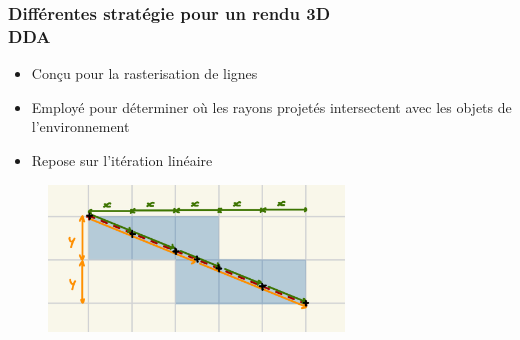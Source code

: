 \documentclass{beamer}
\begin{document}
\begin{frame}
    \frametitle{Différentes stratégie pour un rendu 3D \\
                \small DDA}           
    \begin{block}{}
        \begin{itemize}
            \item Conçu pour la rasterisation de lignes
            \item Employé pour déterminer où les rayons projetés intersectent avec les objets de l'environnement
            \item Repose sur l'itération linéaire
        \end{itemize}
    \end{block}    
    \begin{figure}
        \centering
        \includegraphics[width=0.7\textwidth]{images/DDA.jpg}
    \end{figure}
\end{frame}
\end{document}
